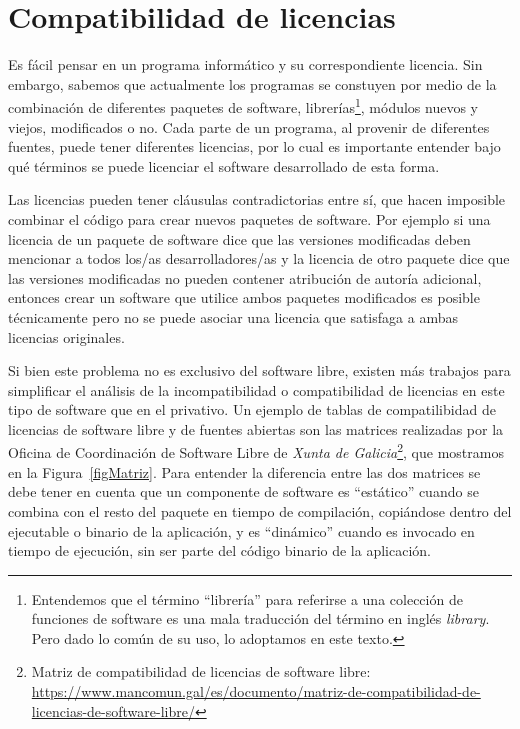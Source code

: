 \section{Compatibilidad de licencias}

Es fácil pensar en un programa informático y su correspondiente licencia. Sin embargo, sabemos que actualmente los programas se constuyen por medio de la combinación de diferentes paquetes de software, librerías\footnote{Entendemos que el término ``librería'' para referirse a una colección de funciones de software es una mala traducción del término en inglés \emph{library}. Pero dado lo común de su uso, lo adoptamos en este texto.}, módulos nuevos y viejos, modificados o no. Cada parte de un programa, al provenir de diferentes fuentes, puede tener diferentes licencias, por lo cual es importante entender bajo qué términos se puede licenciar el software desarrollado de esta forma. 

Las licencias pueden tener cláusulas contradictorias entre sí, que hacen imposible combinar el código para crear nuevos paquetes de software. Por ejemplo si una licencia de un paquete de software dice que las versiones modificadas deben mencionar a todos los/as desarrolladores/as y la licencia de otro paquete dice que las versiones modificadas no pueden contener atribución de autoría adicional, entonces crear un software que utilice ambos paquetes modificados es posible técnicamente pero no se puede asociar una licencia que satisfaga a ambas licencias originales. 

Si bien este problema no es exclusivo del software libre, existen más trabajos para simplificar el análisis de la incompatibilidad o compatibilidad de licencias en este tipo de software que en el privativo. Un ejemplo de tablas de compatilibidad de licencias de software libre y de fuentes abiertas son las matrices realizadas por la Oficina de Coordinación de Software Libre de \emph{Xunta de Galicia}\footnote{Matriz de compatibilidad de licencias de software libre: \url{https://www.mancomun.gal/es/documento/matriz-de-compatibilidad-de-licencias-de-software-libre/}}, que mostramos en la Figura~\ref{figMatriz}. Para entender la diferencia entre las dos matrices se debe tener en cuenta que un componente de software es ``estático'' cuando se combina con el resto del paquete en tiempo de compilación, copiándose dentro del ejecutable o binario de la aplicación, y es ``dinámico'' cuando es invocado en tiempo de ejecución, sin ser parte del código binario de la aplicación.

